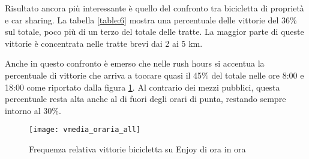 Risultato ancora più interessante è quello del confronto tra bicicletta di proprietà e car sharing. La tabella \ref{table:6} mostra una percentuale delle vittorie del 36\% sul totale, poco più di un terzo del totale delle tratte. La maggior parte di queste vittorie è concentrata nelle tratte brevi dai 2 ai 5 km.

Anche in questo confronto è emerso che nelle rush hours si accentua la percentuale di vittorie che arriva a toccare quasi il 45\% del totale nelle ore 8:00 e 18:00 come riportato dalla figura \ref{image:14}. Al contrario dei mezzi pubblici, questa percentuale resta alta anche al di fuori degli orari di punta, restando sempre intorno al 30\%.

\begin{figure}[H]
	\texttt{[image: vmedia\_oraria\_all]}
	\caption{Frequenza relativa vittorie bicicletta su Enjoy di ora in ora}
	\label{image:14}
\end{figure}

